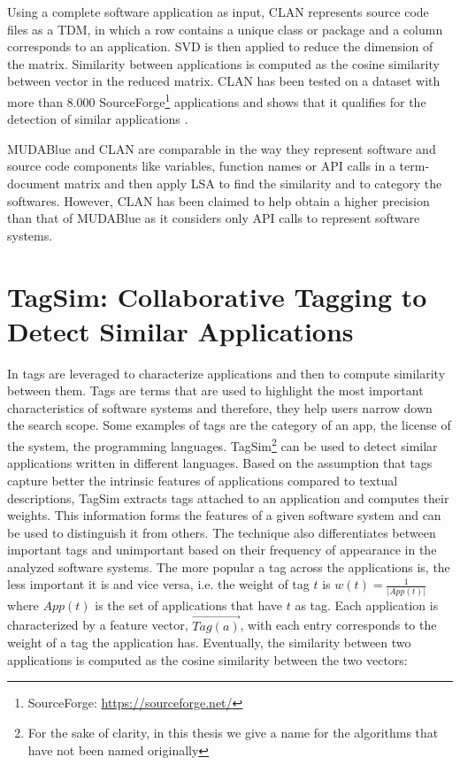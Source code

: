 %



Using a complete software application as input, CLAN represents source code files as a TDM, in which a row contains a unique class or package and a column corresponds to an application. SVD is then applied to reduce the dimension of the matrix. Similarity between applications is computed as the cosine similarity between vector in the reduced matrix. CLAN has been tested on a dataset with more than $8.000$ SourceForge\footnote{SourceForge: \url{https://sourceforge.net/}} applications and shows that it qualifies for the detection of similar applications \cite{McMillan:2012:DSS:2337223.2337267}.

MUDABlue and CLAN are comparable in the way they represent software and source code components like variables, function names or API calls in a term-document matrix and then apply LSA to find the similarity and to category the softwares. However, CLAN has been claimed to help obtain a higher precision than that of MUDABlue as it considers only API calls to represent software systems. 


\section{TagSim: Collaborative Tagging to Detect Similar Applications}\label{sec:tagsim}

In \cite{Lo:2012:DSA:2473496.2473616} tags are leveraged to characterize applications and then to compute similarity between them. Tags are terms that are used to highlight the most important characteristics of software systems \cite{xia:tag:2013} and therefore, they help users narrow down the search scope. Some examples of tags are the category of an app, the license of the system, the programming languages. TagSim\footnote{For the sake of clarity, in this thesis we give a name for the algorithms that have not been named originally} can be used to detect similar applications written in different languages. Based on the assumption that tags capture better the intrinsic features of applications compared to textual descriptions, TagSim extracts tags attached to an application and computes their weights. This information forms the features of a given software system and can be used to distinguish it from others. The technique also differentiates between important tags and unimportant based on their frequency of appearance in the analyzed software systems. The more popular a tag across the applications is, the less important it is and vice versa, i.e. the weight of tag $t$ is $w(t) = \frac{1}{|App(t)|}$ where $App(t)$ is the set of applications that have $t$ as tag. Each application is characterized by a feature vector, $\vec{Tag(a)}$, with each entry corresponds to the weight of a tag the application has. Eventually, the similarity between two applications is computed as the cosine similarity between the two vectors:

